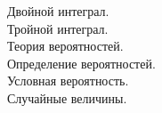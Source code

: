 \documentclass[a4paper]{article}
\begin{document}
Двойной интеграл. \\


Тройной интеграл. \\


Теория вероятностей. \\
Определение вероятностей. \\


Условная вероятность. \\


Случайные величины. \\

\end{document}
